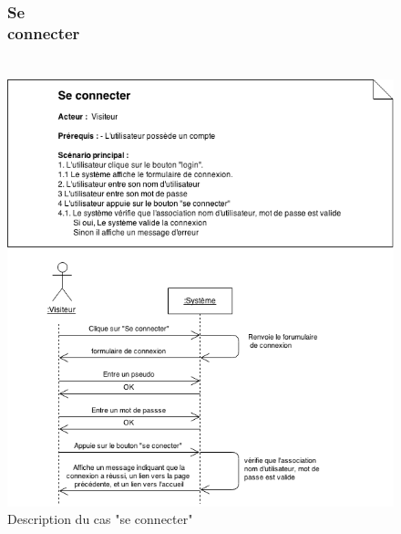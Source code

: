\documentclass[12pt]{report}
\begin{document}
\begin{figure}[!h]
\centering
\subsubsection{Se connecter~~~~~~~~~~~~~~~~~~~~~~~~~~~~~~~~~~~~~~~}
\includegraphics[width=1.\textwidth]{./ressources/desc_UC_connecter.png}
\caption{Description du cas "se connecter"}
\end{figure}
\clearpage
\end{document}
